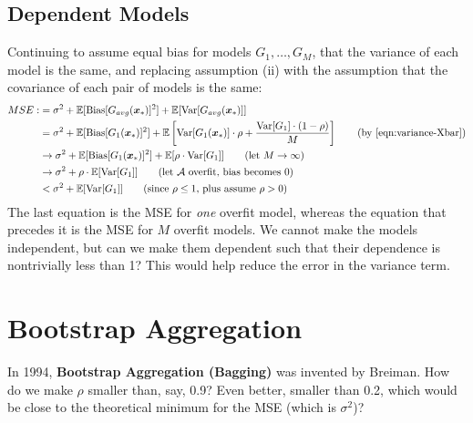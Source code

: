 \documentclass[12pt, a4paper]{article}
\theoremstyle{definition}
\begin{document}
	\subsection*{Dependent Models}
	Continuing to assume equal bias for models $G_1,\ldots,G_M$, that
	the variance of each model is the same, and replacing assumption (ii)
	with the assumption that
	the covariance of each pair of models is the same:
	\begin{align*}
		MSE :
		&=\sigma^2 + \mathbb{E}[\text{Bias}[G_{avg}(\bm{x}_*)]^2]
		+\mathbb{E}[\text{Var}[G_{avg}(\bm{x}_{*})]]\\
		&=\sigma^2 + \mathbb{E}[\text{Bias}[G_{1}(\bm{x}_*)]^2]
		+\mathbb{E}\left[\text{Var}[G_{1}(\bm{x}_{*})]\cdot \rho +
		\frac{\text{Var}[G_1]\cdot (1-\rho)}{M}
		 \right]
		 \tag{by \ref{eqn:variance-Xbar}}\\
 		&\to\sigma^2 + \mathbb{E}[\text{Bias}[G_1(\bm{x}_*)]^2] +
 		\mathbb{E}[\rho \cdot \text{Var}[G_1]]
 		\tag{let $M\to\infty$}\\
 		&\to\sigma^2+\rho \cdot \mathbb{E}[\text{Var}[G_1]]
 		\tag{let $\mathcal{A}$ overfit, bias becomes 0}\\
 		&<\sigma^2 + \mathbb{E}[\text{Var}[G_1]]
 		\tag{since $\rho \leq 1$, plus assume $\rho>0$}
	\end{align*}
	The last equation is the MSE for \textit{one} overfit model, whereas
	the equation that precedes it is the MSE for $M$ overfit models.
	We cannot make the models independent, but can we make them dependent
	such that their dependence is nontrivially less than 1? This would
	help reduce the error in the variance term.
	\section*{Bootstrap Aggregation}
	In 1994, \textbf{Bootstrap Aggregation (Bagging)} was invented by
	Breiman. How do we make $\rho$ smaller than, say, 0.9? Even better,
	smaller than 0.2, which would be close to the theoretical minimum
	for the MSE (which is $\sigma^2$)?
	
\end{document}

